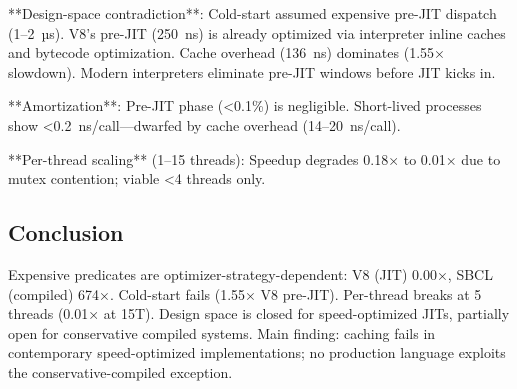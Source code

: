 \documentclass[sigplan,final,acmsmall,review,screen]{acmart}
\begin{document}
**Design-space contradiction**: Cold-start assumed expensive pre-JIT dispatch (1--2~µs). V8's pre-JIT (250~ns) is already optimized via interpreter inline caches and bytecode optimization. Cache overhead (136~ns) dominates (1.55× slowdown). Modern interpreters eliminate pre-JIT windows before JIT kicks in.

**Amortization**: Pre-JIT phase (<0.1\%) is negligible. Short-lived processes show <0.2~ns/call—dwarfed by cache overhead (14--20~ns/call).

**Per-thread scaling** (1--15 threads): Speedup degrades 0.18× to 0.01× due to mutex contention; viable <4 threads only.

\subsection{Conclusion}

Expensive predicates are optimizer-strategy-dependent: V8 (JIT) 0.00×, SBCL (compiled) 674×. Cold-start fails (1.55× V8 pre-JIT). Per-thread breaks at 5 threads (0.01× at 15T). Design space is closed for speed-optimized JITs, partially open for conservative compiled systems. Main finding: caching fails in contemporary speed-optimized implementations; no production language exploits the conservative-compiled exception.


\end{document}

